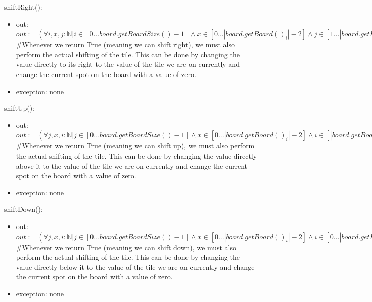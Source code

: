 \documentclass[12pt]{article}
\begin{document}
\noindent shiftRight():
\begin{itemize}
\item out: $out := (\forall i,x,j : \mathbb{N} \vert i \in [0...board.getBoardSize() - 1] \land x \in [0...|board.getBoard()_i| - 2] \land j \in [1...|board.getBoard()_i| - 2] \vert (board.getBoardValueAt(i, j + 1) = 0 \land \lnot (board.getBoardValueAt(i, j) = 0) \Rightarrow True) \vert (True \Rightarrow False)))$\\
\#Whenever we return True (meaning we can shift right), we must also perform the actual shifting of the tile. This can be done by changing the  value directly to its right to the value of the tile we are on currently and change the current spot on the board with a value of zero.
\item exception: none
\end{itemize}

\noindent shiftUp():
\begin{itemize}
\item out: $out := (\forall j,x,i : \mathbb{N} \vert j \in [0...board.getBoardSize() - 1] \land x \in [0...|board.getBoard()_i| - 2] \land i \in [|board.getBoard()_i| - 2...1] \vert (board.getBoardValueAt(i - 1, j) = 0 \land \lnot (board.getBoardValueAt(i, j) = 0) \Rightarrow True) \vert (True \Rightarrow False)))$\\
\#Whenever we return True (meaning we can shift up), we must also perform the actual shifting of the tile. This can be done by changing the  value directly above it to the value of the tile we are on currently and change the current spot on the board with a value of zero.
\item exception: none
\end{itemize}

\noindent shiftDown():
\begin{itemize}
\item out: $out := (\forall j,x,i : \mathbb{N} \vert j \in [0...board.getBoardSize() - 1] \land x \in [0...|board.getBoard()_i| - 2] \land i \in [0...|board.getBoard()_i| - 2] \vert (board.getBoardValueAt(i + 1, j) = 0 \land \lnot (board.getBoardValueAt(i, j) = 0) \Rightarrow True) \vert (True \Rightarrow False)))$\\
\#Whenever we return True (meaning we can shift down), we must also perform the actual shifting of the tile. This can be done by changing the  value directly below it to the value of the tile we are on currently and change the current spot on the board with a value of zero.
\item exception: none
\end{itemize}
\end{document}
